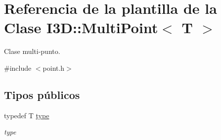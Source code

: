 \hypertarget{class_i3_d_1_1_multi_point}{}\section{Referencia de la plantilla de la Clase I3D\+:\+:Multi\+Point$<$ T $>$}
\label{class_i3_d_1_1_multi_point}


Clase multi-\/punto.  




{\ttfamily \#include $<$point.\+h$>$}

\subsection*{Tipos públicos}
\begin{DoxyCompactItemize}
\item 
typedef T \hyperlink{class_i3_d_1_1_multi_point_ae8bafa5f4c3f71c19b294e5495683582}{type}
\begin{DoxyCompactList}\small\item\em type \end{DoxyCompactList}\end{DoxyCompactItemize}
